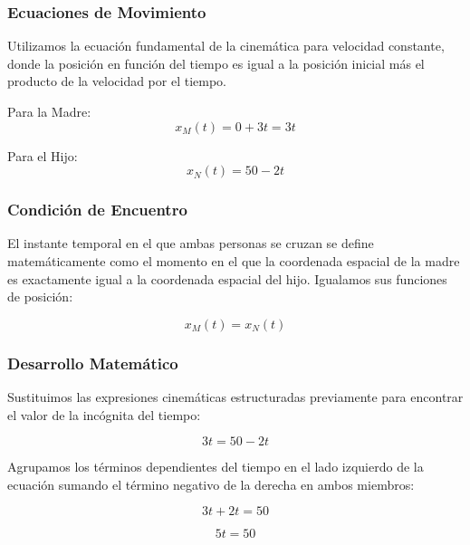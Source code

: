 \documentclass[12pt, a4paper]{article}
\begin{document}
\subsubsection*{Ecuaciones de Movimiento}

Utilizamos la ecuación fundamental de la cinemática para velocidad constante, donde la posición en función del tiempo es igual a la posición inicial más el producto de la velocidad por el tiempo.

Para la Madre:
\begin{equation}
x_M(t) = 0 + 3t = 3t
\end{equation}

Para el Hijo:
\begin{equation}
x_N(t) = 50 - 2t
\end{equation}

\subsubsection*{Condición de Encuentro}

El instante temporal en el que ambas personas se cruzan se define matemáticamente como el momento en el que la coordenada espacial de la madre es exactamente igual a la coordenada espacial del hijo. Igualamos sus funciones de posición:

\begin{equation}
x_M(t) = x_N(t)
\end{equation}

\subsubsection*{Desarrollo Matemático}

Sustituimos las expresiones cinemáticas estructuradas previamente para encontrar el valor de la incógnita del tiempo:

\begin{equation}
3t = 50 - 2t
\end{equation}

Agrupamos los términos dependientes del tiempo en el lado izquierdo de la ecuación sumando el término negativo de la derecha en ambos miembros:

\begin{equation}
3t + 2t = 50
\end{equation}

\begin{equation}
5t = 50
\end{equation}
\end{document}
